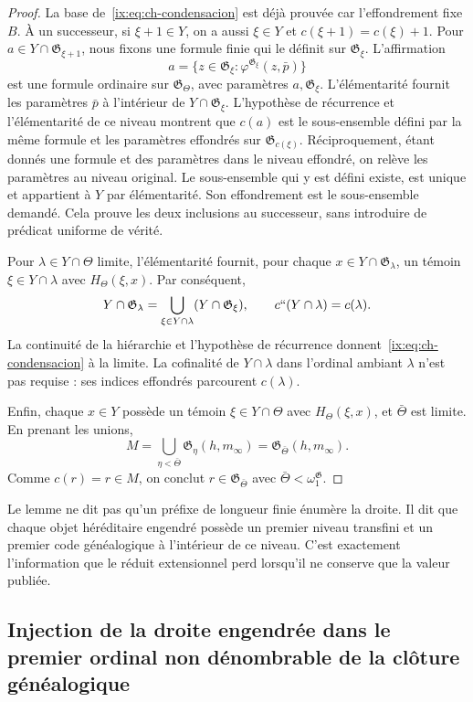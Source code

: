 \begin{proof}
La base de~\eqref{ix:eq:ch-condensacion} est déjà prouvée car l’effondrement fixe \(B\). À un
successeur, si \(\xi+1\in Y\), on a aussi \(\xi\in Y\) et
\(c(\xi+1)=c(\xi)+1\). Pour
\(a\in Y\cap\mathfrak G_{\xi+1}\), nous fixons une formule finie qui le
définit sur \(\mathfrak G_\xi\). L’affirmation
\[
 a=\{z\in\mathfrak G_\xi:
                  \varphi^{\mathfrak G_\xi}(z,\bar p)\}
\]
est une formule ordinaire sur \(\mathfrak G_\Theta\), avec paramètres \(a,\mathfrak G_\xi\). L'élémentarité fournit les paramètres \(\bar p\) à l'intérieur de \(Y\cap\mathfrak G_\xi\). L'hypothèse de récurrence et l'élémentarité de ce niveau montrent que \(c(a)\) est le sous-ensemble défini par la même formule et les paramètres effondrés sur \(\mathfrak G_{c(\xi)}\). Réciproquement, étant donnés une formule et des paramètres dans le niveau effondré, on relève les paramètres au niveau original. Le sous-ensemble qui y est défini existe, est unique et appartient à \(Y\) par élémentarité. Son effondrement est le sous-ensemble demandé. Cela prouve les deux inclusions au successeur, sans introduire de prédicat uniforme de vérité.

Pour \(\lambda\in Y\cap\Theta\) limite, l’élémentarité fournit,
pour chaque \(x\in Y\cap\mathfrak G_\lambda\), un témoin
\(\xi\in Y\cap\lambda\) avec \(H_\Theta(\xi,x)\). Par conséquent,
\[
 Y\cap\mathfrak G_\lambda
 =\bigcup_{\xi\in Y\cap\lambda}(Y\cap\mathfrak G_\xi),
 \qquad c``(Y\cap\lambda)=c(\lambda).
\]
La continuité de la hiérarchie et l’hypothèse de récurrence donnent~\eqref{ix:eq:ch-condensacion} à la
limite. La cofinalité de \(Y\cap\lambda\) dans l’ordinal
ambiant \(\lambda\) n’est pas requise : ses indices effondrés parcourent \(c(\lambda)\).

Enfin, chaque \(x\in Y\) possède un témoin \(\xi\in Y\cap\Theta\)
avec \(H_\Theta(\xi,x)\), et \(\bar\Theta\) est limite. En prenant les unions,
\[
 M=\bigcup_{\eta<\bar\Theta}\mathfrak G_\eta(h,m_\infty)
  =\mathfrak G_{\bar\Theta}(h,m_\infty).
\]
Comme \(c(r)=r\in M\), on conclut
\(r\in\mathfrak G_{\bar\Theta}\) avec
\(\bar\Theta<\omega_1^{\mathfrak G}\).
\end{proof}

Le lemme ne dit pas qu’un préfixe de longueur finie énumère la droite. Il dit que
chaque objet héréditaire engendré possède un premier niveau transfini et un premier
code généalogique à l’intérieur de ce niveau. C’est exactement l’information que
le réduit extensionnel perd lorsqu’il ne conserve que la valeur publiée.

\subsection{Injection de la droite engendrée dans le premier ordinal non dénombrable de la clôture généalogique}

